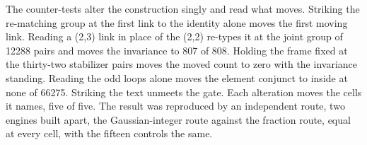 \begin{chproof}
The counter-tests alter the construction singly and read what moves. Striking the re-matching group at the first link to the identity alone moves the first moving link. Reading a (2,3) link in place of the (2,2) re-types it at the joint group of 12288 pairs and moves the invariance to 807 of 808. Holding the frame fixed at the thirty-two stabilizer pairs moves the moved count to zero with the invariance standing. Reading the odd loops alone moves the element conjunct to inside at none of 66275. Striking the text unmeets the gate. Each alteration moves the cells it names, five of five. The result was reproduced by an independent route, two engines built apart, the Gaussian-integer route against the fraction route, equal at every cell, with the fifteen controls the same.
\end{chproof}
\par\medskip{}\label{narr:close:5-1}\par

